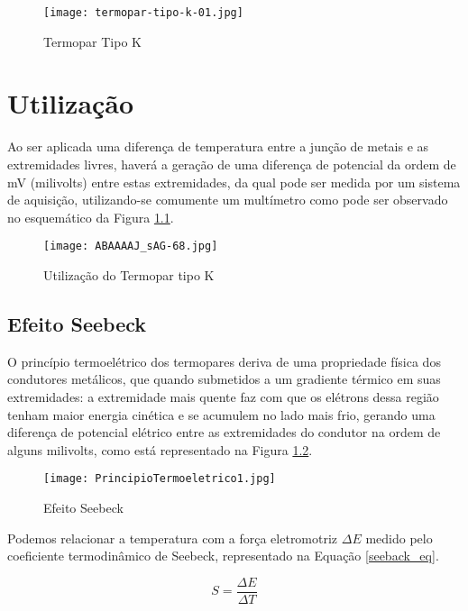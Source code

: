 \documentclass[a4paper,12pt]{report}
\begin{document}
	\begin{figure}[htbp]
		\centering
		\texttt{[image: termopar-tipo-k-01.jpg]}
		\caption{Termopar Tipo K}
		\label{real}
	\end{figure}
	
	\chapter{Utilização}
	Ao ser aplicada uma diferença de temperatura entre a junção de metais e as extremidades livres, haverá a geração de uma diferença de potencial da ordem de mV (milivolts) entre estas extremidades, da qual pode ser medida por um sistema de aquisição, utilizando-se comumente um multímetro como pode ser observado no esquemático da Figura \ref{esquematico}.
	
	\hfill \break
	\hfill \break
	
	\begin{figure}[htbp]
		\centering
		\texttt{[image: ABAAAAJ\_sAG-68.jpg]}
		\caption{Utilização do Termopar tipo K}
		\label{esquematico}
	\end{figure}
	
	\pagebreak
	
	\section{Efeito Seebeck}
	
	O princípio termoelétrico dos termopares deriva de uma propriedade física dos condutores metálicos, que quando  submetidos a um gradiente térmico em suas extremidades: a extremidade mais quente faz com que os elétrons dessa região tenham maior energia cinética e se acumulem no lado mais frio, gerando uma diferença de potencial elétrico entre as extremidades do condutor na ordem de alguns milivolts, como está representado na Figura \ref{seebeck}.
	
	\begin{figure}[htbp]
		\centering
		\texttt{[image: PrincipioTermoeletrico1.jpg]}
		\caption{Efeito Seebeck}
		\label{seebeck}
	\end{figure}
	
	\noindent Podemos relacionar a temperatura com a força eletromotriz $\Delta E$ medido pelo coeficiente termodinâmico de Seebeck, representado na Equação \ref{seeback_eq}.
	
	\begin{equation}
	S = \frac{\Delta E}{\Delta T}
	\label{seeback_eq}
	\end{equation}  
	
\end{document}
